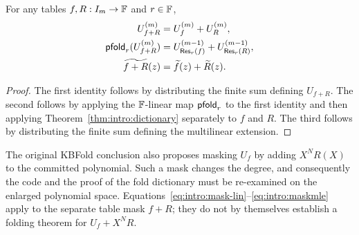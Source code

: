 \begin{lemma}\label{lem:intro:linear-masks}
For any tables $f,R:I_m\to\mathbb{F}$ and $r\in\mathbb{F}$,
\begin{align}
 U_{f+R}^{(m)}&=U_f^{(m)}+U_R^{(m)},\label{eq:intro:mask-lin}\\
 \mathsf{pfold}_r(U_{f+R}^{(m)})&=U_{\mathsf{Res}_r(f)}^{(m-1)}+U_{\mathsf{Res}_r(R)}^{(m-1)},\label{eq:intro:maskfold}\\
 \widetilde{f+R}(z)&=\widetilde f(z)+\widetilde R(z).\label{eq:intro:maskmle}
\end{align}
\end{lemma}
\begin{proof}
The first identity follows by distributing the finite sum defining $U_{f+R}$. The second follows by applying the $\mathbb{F}$-linear map $\mathsf{pfold}_r$ to the first identity and then applying Theorem~\ref{thm:intro:dictionary} separately to $f$ and $R$. The third follows by distributing the finite sum defining the multilinear extension.
\end{proof}

\begin{remark}
The original KBFold conclusion also proposes masking $U_f$ by adding $X^N R(X)$ to the committed polynomial. Such a mask changes the degree, and consequently the code and the proof of the fold dictionary must be re-examined on the enlarged polynomial space. Equations~\eqref{eq:intro:mask-lin}--\eqref{eq:intro:maskmle} apply to the separate table mask $f+R$; they do not by themselves establish a folding theorem for $U_f+X^N R$.
\end{remark}
